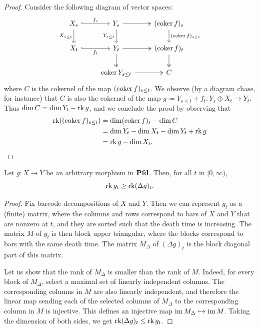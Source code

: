 \begin{proof}
  Consider the following diagram of vector spaces:
  \[
    \begin{tikzcd}
    X_s
      \arrow[r, hook, "f_s"]
      \arrow[d, "X_{s \leq t}" swap]
    &
    Y_s
      \arrow[r, two heads]
      \arrow[d, "Y_{s \leq t}" swap]
    &
    (\coker f)_s
      \arrow[d, "(\coker f)_{s \leq t}"]
    \\
    X_t
      \arrow[r, hook, "f_t" swap]
    &
    Y_t
      \arrow[r, two heads]
      \arrow[d, two heads]
    &
    (\coker f)_t
      \arrow[d, two heads]
    \\
    &
    \coker Y_{s \leq t}
      \arrow[r, two heads]
    &
    C
    \end{tikzcd}
  \]
  where $C$ is the cokernel of the map $(\operatorname{coker} f)_{s \leq t}$. We observe (by a diagram chase, for instance) that $C$ is also the cokernel of the map $g \coloneq Y_{s \leq t} + f_t \colon Y_s \oplus X_t \to Y_t$. Thus $\dim C = \dim Y_t - \operatorname{rk} g$, and we conclude the proof by observing that
  \begin{align*}
    \operatorname{rk}((\operatorname{coker} f)_{s \leq t}) & = \dim (\operatorname{coker} f)_t - \dim C \\
    & = \dim Y_t - \dim X_t - \dim Y_t + \operatorname{rk} g \\
    & = \operatorname{rk} g - \dim X_t. \qedhere
  \end{align*}
\end{proof}

\begin{lemma}
\label{C!L:delta-rank-ineq}
  Let $g \colon X \to Y$ be an arbitrary morphism in $\operatorname{\mathbf{Pfd}}$. Then, for all $t$ in $[0, \infty)$,
  \[
    \operatorname{rk} g_t \geq \operatorname{rk} (\Delta g)_t.
  \]
\end{lemma}

\begin{proof}
  Fix barcode decompositions of $X$ and $Y$. Then we can represent $g_t$ as a (finite) matrix, where the columns and rows correspond to bars of $X$ and $Y$ that are nonzero at $t$, and they are sorted such that the death time is increasing. The matrix $M$ of $g_t$ is then block upper triangular, where the blocks correspond to bars with the same death time. The matrix $M_\Delta$ of $(\Delta g)_t$ is the block diagonal part of this matrix.

  Let us show that the rank of $M_\Delta$ is smaller than the rank of $M$. Indeed, for every block of $M_\Delta$, select a maximal set of linearly independent columns. The corresponding columns in $M$ are also linearly independent, and therefore the linear map sending each of the selected columns of $M_\Delta$ to the corresponding column in $M$ is injective. This defines an injective map $\operatorname{im} M_\Delta \hookrightarrow \operatorname{im} M$. Taking the dimension of both sides, we get $\operatorname{rk} (\Delta g)_t \leq \operatorname{rk} g_t$.
\end{proof}

